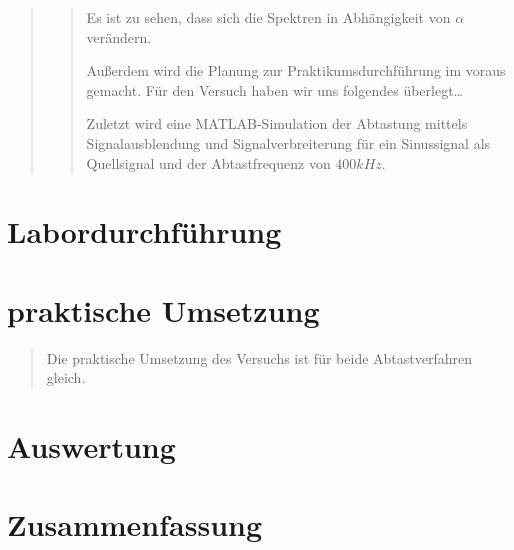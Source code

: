 \begin{quote}
\begin{quote}
    	Es ist zu sehen, dass sich die Spektren in Abhängigkeit von $\alpha$
    	verändern.
    	
    	Außerdem wird die Planung zur Praktikumsdurchführung im voraus gemacht. Für
    	den Versuch haben wir uns folgendes überlegt\ldots
    	
    	Zuletzt wird eine MATLAB-Simulation der Abtastung mittels Signalausblendung
    	und Signalverbreiterung für ein Sinussignal als Quellsignal und der
    	Abtastfrequenz von $400 kHz$.
    \end{quote}%

\end{quote}%
    
    \section{Labordurchführung}
    \begin{quote}
   	\end{quote}%
    	    
    
    \section{praktische Umsetzung}
    \begin{quote}
    Die praktische Umsetzung des Versuchs ist für beide Abtastverfahren gleich.
    
    \end{quote}%
    
    
    \section{Auswertung}
    \begin{quote}    
    \end{quote}%
    
    \section{Zusammenfassung}
    \begin{quote}
    \end{quote}%

